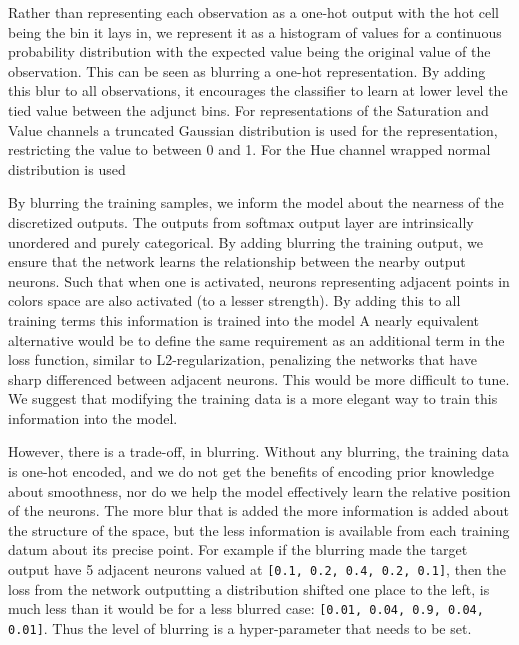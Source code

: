 


Rather than representing each observation as a one-hot output with the hot cell being the bin it lays in, we represent it as a histogram of values for a continuous probability distribution with the expected value being the original value of the observation.
This can be seen as blurring a one-hot representation.
By adding this blur to all observations, it encourages the classifier to learn at lower level the tied value between the adjunct bins.
For representations of the Saturation and Value channels a truncated Gaussian distribution is used for the representation, restricting the value to between 0 and 1.
For the Hue channel wrapped normal distribution is used



By blurring the training samples, we inform the model about the nearness of the discretized outputs.
The outputs from softmax output layer are intrinsically unordered and purely categorical.
By adding blurring the training output, we ensure that the network learns the relationship between the nearby output neurons.
Such that when one is activated, neurons representing  adjacent points in colors space are also activated (to a lesser strength).
By adding this to all training terms this information is trained into the model
A nearly equivalent alternative would be to define the same requirement as an additional term in the loss function, similar to L2-regularization, penalizing the networks that have sharp differenced between adjacent neurons.
This would be more difficult to tune.
We suggest that modifying the training data is a more elegant way to train this information into the model.

However, there is a trade-off, in blurring.
Without any blurring, the training data is one-hot encoded, and we do not get the benefits of encoding prior knowledge about smoothness, nor do we help the model effectively learn the relative position of the neurons.
The more blur that is added the more information is added about the structure of the space,
but the less information is available from each training datum about its precise point.
For example if the blurring made the target output have 5 adjacent neurons valued at \texttt{[0.1, 0.2, 0.4, 0.2, 0.1]}, then the loss from the network outputting a distribution shifted one place to the left, is much less than it would be for a less blurred case: \texttt{[0.01, 0.04, 0.9, 0.04, 0.01]}.
Thus the level of blurring is a hyper-parameter that needs to be set.


